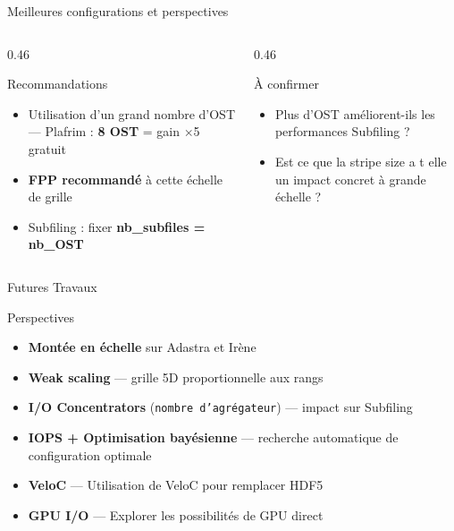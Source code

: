 \documentclass[svgnames,9pt,aspectratio=169]{beamer}
\begin{document}
\begin{frame}{Meilleures configurations et perspectives}

  \vspace{0.5em}

  \begin{columns}[t]
    \begin{column}{0.46\textwidth}
      \begin{block}{Recommandations}
        \begin{itemize}
          \item Utilisation d'un grand nombre d'OST --- Plafrim : \textbf{8 OST} = gain $\times$5 gratuit
          \item \textbf{FPP recommandé} à cette échelle de grille
          \item Subfiling : fixer \textbf{nb\_subfiles = nb\_OST}
        \end{itemize}
      \end{block}

      \vspace{0.8em}
    \end{column}
    \begin{column}{0.46\textwidth}
      \begin{exampleblock}{À confirmer}
        \begin{itemize}
          \item Plus d'OST améliorent-ils les performances Subfiling ?
          \item Est ce que la stripe size a t elle un impact concret à grande échelle ?
        \end{itemize}
      \end{exampleblock}
    \end{column}
  \end{columns}
\end{frame}

\begin{frame}{Futures Travaux}
  \begin{block}{Perspectives}
    \begin{itemize}
      \item \textbf{Montée en échelle} sur Adastra et Irène
      \item \textbf{Weak scaling} --- grille 5D proportionnelle aux rangs
      \item \textbf{I/O Concentrators} (\texttt{nombre d'agrégateur}) --- impact sur Subfiling
      \item \textbf{IOPS + Optimisation bayésienne} --- recherche automatique de configuration optimale
      \item \textbf{VeloC}  --- Utilisation de VeloC pour remplacer HDF5
      \item \textbf{GPU I/O} --- Explorer les possibilités de GPU direct
    \end{itemize}
  \end{block}
\end{frame}

\frame{\merci}
\end{document}
